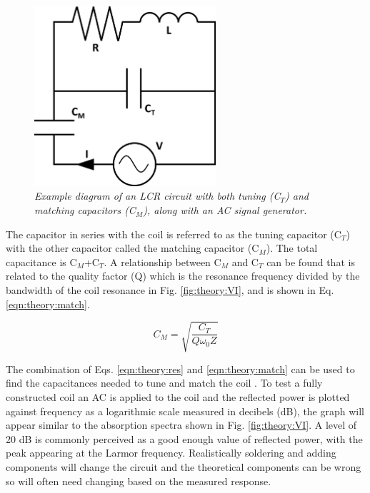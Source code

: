 \begin{figure}
    \centering
    \includegraphics[width=0.6\textwidth]{Figures/Theory/RLC_Circuit.png}
    \caption{\textit{Example diagram of an LCR circuit with both tuning (C$_T$) and matching capacitors (C$_M$), along with an AC signal generator.}}
    \label{fig:theory:RLC}
\end{figure}

The capacitor in series with the coil is referred to as the tuning capacitor (C$_T$) with the other capacitor called the matching capacitor (C$_M$). The total capacitance is C$_M$+C$_T$. A relationship between C$_M$ and C$_T$ can be found that is related to the quality factor (Q) \cite{Chen1989ChapterNoise} which is the resonance frequency divided by the bandwidth of the coil resonance in Fig. \ref{fig:theory:VI}, and is shown in Eq. \ref{eqn:theory:match}. 

\begin{equation}
    C_M = \sqrt{\frac{C_T}{Q\omega_0Z}}
    \label{eqn:theory:match}
\end{equation}

The combination of Eqs. \ref{eqn:theory:res} and \ref{eqn:theory:match} can be used to find the capacitances needed to tune and match the coil \cite{Chen1989ChapterNoise}. To test a fully constructed coil an \ac{AC} is applied to the coil and the reflected power is plotted against frequency as a logarithmic scale measured in decibels (dB), the graph will appear similar to the absorption spectra shown in Fig. \ref{fig:theory:VI}. A level of 20 dB is commonly perceived as a good enough value of reflected power, with the peak appearing at the Larmor frequency. Realistically soldering and adding components will change the circuit and the theoretical components can be wrong so will often need changing based on the measured response.

